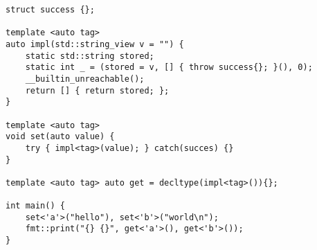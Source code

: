 \begin{verbatim}
struct success {};

template <auto tag>
auto impl(std::string_view v = "") {
    static std::string stored;
    static int _ = (stored = v, [] { throw success{}; }(), 0);
    __builtin_unreachable();
    return [] { return stored; };
}

template <auto tag>
void set(auto value) {
    try { impl<tag>(value); } catch(succes) {}
}

template <auto tag> auto get = decltype(impl<tag>()){};

int main() {
    set<'a'>("hello"), set<'b'>("world\n");
    fmt::print("{} {}", get<'a'>(), get<'b'>());
}
\end{verbatim}

\begin{comment}
\begin{verbatim}
auto foo(int new_value) {
    static int v;
    static auto _ = 
        (v = new_value, [] { throw std::function{[] { return v; }}; }(), 0);
    __builtin_unreachable();
    return []{ return v; };
}

auto get = decltype(foo(0)){};

void test(int i) {
    try {
        foo(i);
    } catch (std::function<int> f) {
        assert(f() == get());
    }
}
\end{verbatim}
\end{comment}

